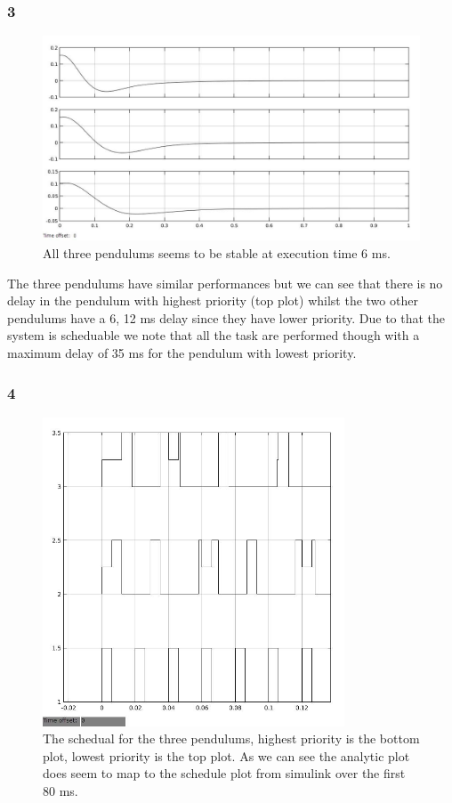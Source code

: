 \documentclass[10pt,a4paper]{article}
\begin{document}
\subsubsection*{3}
\begin{figure}[!ht]
  \centering
    \includegraphics[width=1\textwidth]{6ms.jpg}
      \caption{All three pendulums seems to be stable at execution time 6 ms.}
\end{figure}
The three pendulums have similar performances but we can see that there is no delay in the pendulum with highest priority (top plot) whilst the two other pendulums have a 6, 12 ms delay since they have lower priority. Due to that the system is scheduable we note that all the task are performed though with a maximum delay of 35 ms for the pendulum with lowest priority. 
\newpage
\subsubsection*{4}
\begin{figure}[!h]
  \centering
    \includegraphics[width=0.8\textwidth]{schedual6ms.jpg}
      \caption{The schedual for the three pendulums, highest priority is the bottom plot, lowest priority is the top plot. As we can see the analytic plot does seem to map to the schedule plot from simulink over the first 80 ms.}
\end{figure}
\end{document}
